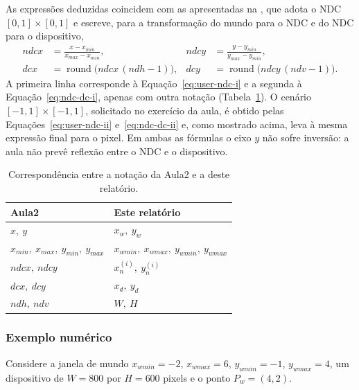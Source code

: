 As expressões deduzidas coincidem com as apresentadas na \aularef, que adota o NDC $[0,1] \times [0,1]$ e escreve, para a transformação do mundo para o NDC e do NDC para o dispositivo,
\begin{align*}
    \mathit{ndcx} &= \frac{x - x_{min}}{x_{max} - x_{min}}, &
    \mathit{ndcy} &= \frac{y - y_{min}}{y_{max} - y_{min}}, \\[1mm]
    \mathit{dcx} &= \operatorname{round}\!\big(\mathit{ndcx}\,(\mathit{ndh} - 1)\big), &
    \mathit{dcy} &= \operatorname{round}\!\big(\mathit{ndcy}\,(\mathit{ndv} - 1)\big).
\end{align*}
A primeira linha corresponde à Equação~\eqref{eq:user-ndc-i} e a segunda à Equação~\eqref{eq:ndc-dc-i}, apenas com outra notação (Tabela~\ref{tab:notacao}). O cenário $[-1,1] \times [-1,1]$, solicitado no exercício da aula, é obtido pelas Equações~\eqref{eq:user-ndc-ii} e~\eqref{eq:ndc-dc-ii} e, como mostrado acima, leva à mesma expressão final para o pixel. Em ambas as fórmulas o eixo $y$ não sofre inversão: a aula não prevê reflexão entre o NDC e o dispositivo.

\begin{table}[H]
    \centering
    \renewcommand{\arraystretch}{1.5}
    \small
    \begin{tabular}{l|l}
        \textbf{Aula2} & \textbf{Este relatório} \\ \hline
        $x,\ y$ & $x_w,\ y_w$ \\
        $x_{min},\ x_{max},\ y_{min},\ y_{max}$ & $x_{wmin},\ x_{wmax},\ y_{wmin},\ y_{wmax}$ \\
        $\mathit{ndcx},\ \mathit{ndcy}$ & $x_n^{(i)},\ y_n^{(i)}$ \\
        $\mathit{dcx},\ \mathit{dcy}$ & $x_d,\ y_d$ \\
        $\mathit{ndh},\ \mathit{ndv}$ & $W,\ H$
    \end{tabular}
    \caption{Correspondência entre a notação da Aula2 e a deste relatório.}
    \label{tab:notacao}
\end{table}

\subsubsection{Exemplo numérico}
Considere a janela de mundo $x_{wmin} = -2$, $x_{wmax} = 6$, $y_{wmin} = -1$, $y_{wmax} = 4$, um dispositivo de $W = 800$ por $H = 600$ pixels e o ponto $P_w = (4, 2)$.

